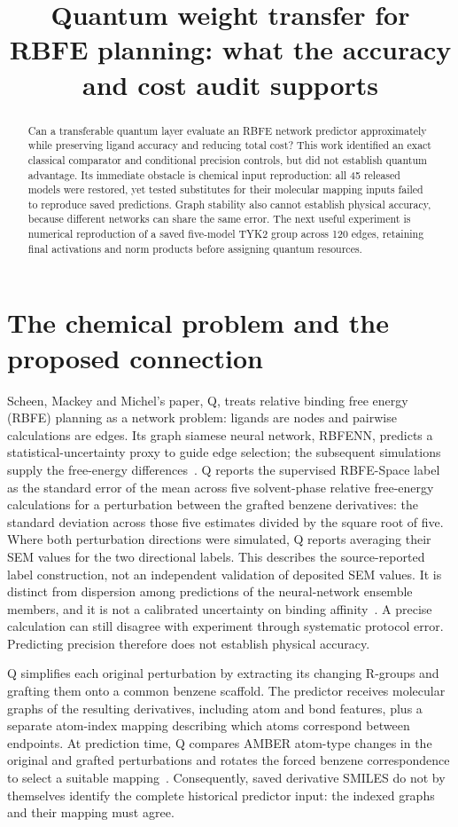 \documentclass{article}
\title{Quantum weight transfer for RBFE planning: what the accuracy and cost audit supports}
\begin{document}
\maketitle

\begin{abstract}
Can a transferable quantum layer evaluate an RBFE network predictor approximately while preserving ligand accuracy and reducing total cost? This work identified an exact classical comparator and conditional precision controls, but did not establish quantum advantage. Its immediate obstacle is chemical input reproduction: all 45 released models were restored, yet tested substitutes for their molecular mapping inputs failed to reproduce saved predictions. Graph stability also cannot establish physical accuracy, because different networks can share the same error. The next useful experiment is numerical reproduction of a saved five-model TYK2 group across 120 edges, retaining final activations and norm products before assigning quantum resources.
\end{abstract}

\section{The chemical problem and the proposed connection}

Scheen, Mackey and Michel's paper, Q, treats relative binding free energy (RBFE) planning as a network problem: ligands are nodes and pairwise calculations are edges. Its graph siamese neural network, RBFENN, predicts a statistical-uncertainty proxy to guide edge selection; the subsequent simulations supply the free-energy differences~\cite{Q}. Q reports the supervised RBFE-Space label as the standard error of the mean across five solvent-phase relative free-energy calculations for a perturbation between the grafted benzene derivatives: the standard deviation across those five estimates divided by the square root of five. Where both perturbation directions were simulated, Q reports averaging their SEM values for the two directional labels. This describes the source-reported label construction, not an independent validation of deposited SEM values. It is distinct from dispersion among predictions of the neural-network ensemble members, and it is not a calibrated uncertainty on binding affinity~\cite{Q}. A precise calculation can still disagree with experiment through systematic protocol error. Predicting precision therefore does not establish physical accuracy.

Q simplifies each original perturbation by extracting its changing R-groups and grafting them onto a common benzene scaffold. The predictor receives molecular graphs of the resulting derivatives, including atom and bond features, plus a separate atom-index mapping describing which atoms correspond between endpoints. At prediction time, Q compares AMBER atom-type changes in the original and grafted perturbations and rotates the forced benzene correspondence to select a suitable mapping~\cite{Q}. Consequently, saved derivative SMILES do not by themselves identify the complete historical predictor input: the indexed graphs and their mapping must agree.
\end{document}
